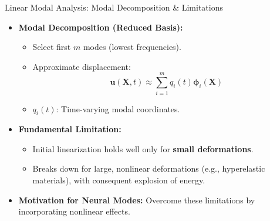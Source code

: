 \documentclass{beamer}
\begin{document}
\begin{frame}{Linear Modal Analysis: Modal Decomposition \& Limitations}
    \begin{itemize}
        \item \textbf{Modal Decomposition (Reduced Basis):}
        \begin{itemize}
            \item Select first \(m\) modes (lowest frequencies).
            \item Approximate displacement:
            \begin{equation*}
                \bm{u}(\bm{X},t) \approx \sum_{i=1}^{m} q_i(t) \bm{\phi}_i(\bm{X})
            \end{equation*}
            \item \(q_i(t)\): Time-varying modal coordinates.
        \end{itemize}
        \item \textbf{Fundamental Limitation:}
        \begin{itemize}
            \item Initial linearization holds well only for \textbf{small deformations}.
            \item Breaks down for large, nonlinear deformations (e.g., hyperelastic materials), with consequent explosion of energy.
        \end{itemize}
        \item \textbf{Motivation for Neural Modes:} Overcome these limitations by incorporating nonlinear effects.
    \end{itemize}
\end{frame}
\end{document}
